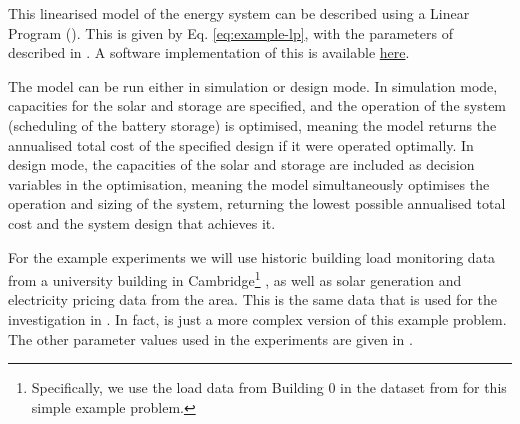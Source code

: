 \begin{subappendices}
This linearised model of the energy system can be described using a Linear Program (). This is given by Eq. \ref{eq:example-lp}, with the parameters of described in . A software implementation of this  is available \href{https://github.com/mal84emma/VoI-Tutorial/blob/main/models/energy_model.py}{here}.

The model can be run either in simulation or design mode. In simulation mode, capacities for the solar and storage are specified, and the operation of the system (scheduling of the battery storage) is optimised, meaning the model returns the annualised total cost of the specified design if it were operated optimally. In design mode, the capacities of the solar and storage are included as decision variables in the optimisation, meaning the model simultaneously optimises the operation and sizing of the system, returning the lowest possible annualised total cost and the system design that achieves it.

For the example experiments we will use historic building load monitoring data from a university building in Cambridge\footnote{Specifically, we use the load data from Building 0 in the dataset from  for this simple example problem.} , as well as solar generation and electricity pricing data from the area. This is the same data that is used for the investigation in . In fact,  is just a more complex version of this example problem. The other parameter values used in the experiments are given in .\\


\end{subappendices}
